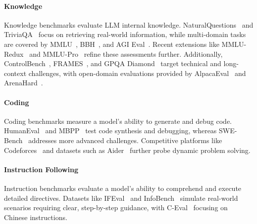 \paragraph{Knowledge}
Knowledge benchmarks evaluate LLM internal knowledge. NaturalQuestions~\citep{kwiatkowski2019natural} and TriviaQA~\citep{joshi2017triviaqa} focus on retrieving real-world information, while multi-domain tasks are covered by MMLU~\citep{hendrycks2020measuring}, BBH~\citep{suzgun2022challenging}, and AGI Eval~\citep{zhong2023agieval}. Recent extensions like MMLU-Redux~\citep{gema2024we} and MMLU-Pro~\citep{wang2024mmlu} refine these assessments further. 
Additionally, ControlBench~\citep{Darioush2024ControlBench}, FRAMES~\citep{krishna2024fact}, and GPQA Diamond~\citep{rein2023gpqagraduatelevelgoogleproofqa} target technical and long-context challenges, with open-domain evaluations provided by AlpacaEval~\citep{alpaca_eval} and ArenaHard~\citep{arenahard2024}.

\paragraph{Coding}
Coding benchmarks measure a model’s ability to generate and debug code. HumanEval~\citep{chen2021evaluating} and MBPP~\citep{austin2021program} test code synthesis and debugging, whereas SWE-Bench~\citep{jimenez2024swebench,yang2024swebenchmultimodal} addresses more advanced challenges. Competitive platforms like Codeforces~\citep{codeforces} and datasets such as Aider~\citep{aider} further probe dynamic problem solving.

\paragraph{Instruction Following}
Instruction benchmarks evaluate a model’s ability to comprehend and execute detailed directives. Datasets like IFEval~\citep{zhou2023instruction} and InfoBench~\citep{qin2024infobench} simulate real-world scenarios requiring clear, step-by-step guidance, with C-Eval~\citep{huang2024c} focusing on Chinese instructions.



